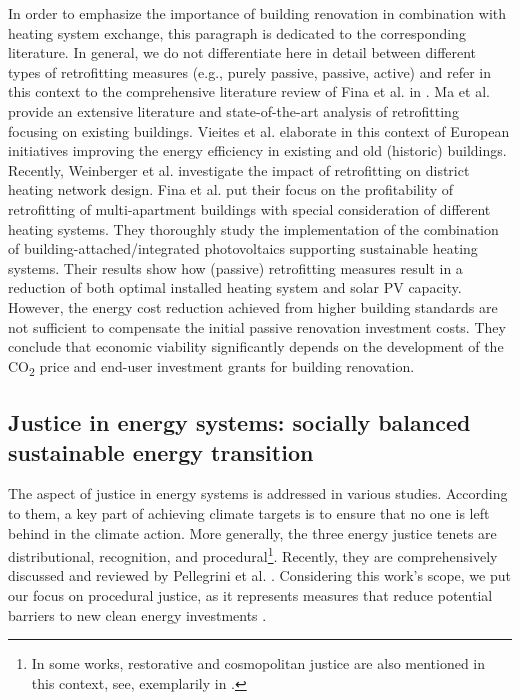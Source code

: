 In order to emphasize the importance of building renovation in combination with heating system exchange, this paragraph is dedicated to the corresponding literature. In general, we do not differentiate here in detail between different types of retrofitting measures (e.g., purely passive, passive, active) and refer in this context to the comprehensive literature review of Fina et al. in \cite{fina2019profitability}. Ma et al. \cite{ma2012existing} provide an extensive literature and state-of-the-art analysis of retrofitting focusing on existing buildings. Vieites et al. \cite{vieites2015european} elaborate in this context of European initiatives improving  the energy efficiency in existing and old (historic) buildings. Recently, Weinberger et al. \cite{weinberger2021investigating} investigate the impact of retrofitting on district heating network design. Fina et al. \cite{fina2019profitability} put their focus on the profitability of retrofitting of multi-apartment buildings with special consideration of different heating systems. They thoroughly study the implementation of the combination of building-attached/integrated photovoltaics supporting sustainable heating systems. Their results show how (passive) retrofitting measures result in a reduction of both optimal installed heating system and solar PV capacity. However, the energy cost reduction achieved from higher building standards are not sufficient to compensate the initial passive renovation investment costs. They conclude that economic viability significantly depends on the development of the CO\textsubscript{2} price and end-user investment grants for building renovation.

\subsection{Justice in energy systems: socially balanced sustainable energy transition}\label{aspect2}
The aspect of justice in energy systems is addressed in various studies. According to them, a key part of achieving climate targets is to ensure that no one is left behind in the climate action. More generally, the three energy justice tenets are distributional, recognition, and procedural\footnote{In some works, restorative and cosmopolitan justice are also mentioned in this context, see, exemplarily in \cite{oxfordjustice2021}.}. Recently, they are comprehensively discussed and reviewed by Pellegrini et al. \cite{pellegrini2020energy}. Considering this work's scope, we put our focus on procedural justice, as it represents measures that reduce potential barriers to new clean energy investments \cite{oxfordjustice2021}.\vspace{0.5cm}

